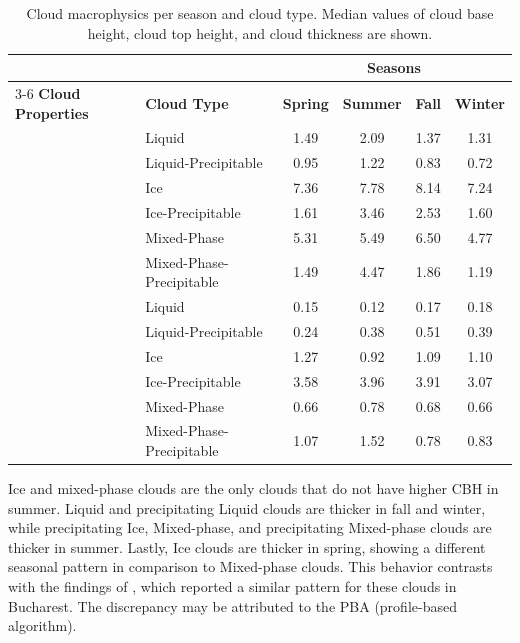 \begin{table}[h!]
	\caption{Cloud macrophysics per season and cloud type. Median values of cloud base height, cloud top height, and cloud thickness are shown.}
	\centering
	\begin{tabular}{llcccc}
		\toprule
		\textbf{} & \textbf{} & \multicolumn{4}{c}{\textbf{Seasons}} \\
		\cmidrule{3-6}
		\textbf{Cloud Properties} & \textbf{Cloud Type} & \textbf{Spring} & \textbf{Summer} & \textbf{Fall} & \textbf{Winter} \\
		\midrule
		\multirow{6}{*}{\shortstack[l]{\textbf{Cloud base height (km)}}} 
		& Liquid          & 1.49  & 2.09  & 1.37  & 1.31  \\
		& Liquid-Precipitable    & 0.95  & 1.22  & 0.83  & 0.72  \\
		& Ice            & 7.36  & 7.78  & 8.14  & 7.24  \\
		& Ice-Precipitable     & 1.61  & 3.46  & 2.53  & 1.60  \\
		& Mixed-Phase        & 5.31  & 5.49  & 6.50  & 4.77  \\
		& Mixed-Phase-Precipitable & 1.49  & 4.47  & 1.86  & 1.19  \\
		\midrule
		\multirow{6}{*}{\shortstack[l]{\textbf{Cloud thickness (km)}}} 
		& Liquid          & 0.15  & 0.12  & 0.17  & 0.18  \\
		& Liquid-Precipitable    & 0.24  & 0.38  & 0.51  & 0.39  \\
		& Ice            & 1.27  & 0.92  & 1.09  & 1.10  \\
		& Ice-Precipitable     & 3.58  & 3.96  & 3.91  & 3.07  \\
		& Mixed-Phase        & 0.66  & 0.78  & 0.68  & 0.66  \\
		& Mixed-Phase-Precipitable & 1.07  & 1.52  & 0.78  & 0.83  \\
		\bottomrule
	\end{tabular}
	\label{tab:cloud_data}
\end{table}

Ice and mixed-phase clouds are the only clouds that do not have higher CBH in summer.
Liquid and precipitating Liquid clouds are thicker in fall and winter, while precipitating Ice, Mixed-phase, and precipitating Mixed-phase clouds are thicker in summer. Lastly, Ice clouds are thicker in spring, showing a different seasonal pattern in comparison to Mixed-phase clouds. This behavior contrasts with the findings of \cite{pirloagaGroundBasedMeasurementsCloud2022}, which reported a similar pattern for these clouds in Bucharest. The discrepancy may be attributed to the PBA (profile-based algorithm). 

